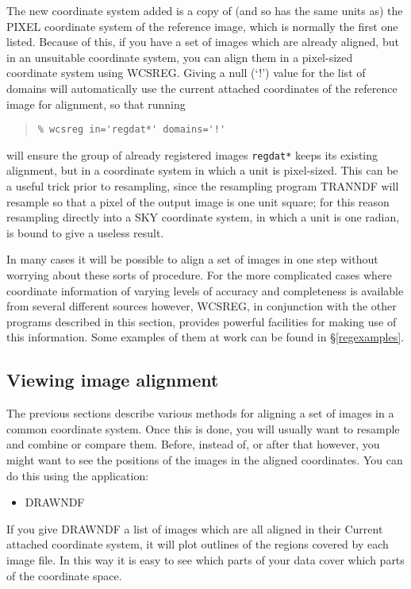 \documentclass[twoside,11pt]{article}
\newcommand{\hyperref}[4]{#2\ref{#4}#3}
\newcommand{\htmlref}[2]{#1}
\newcommand{\xlabel}[1]{}
\renewcommand{\_}{\texttt{\symbol{95}}}
\newenvironment{myquote}{\begin{quote}\begin{small}}{\end{small}\end{quote}}
\newcommand{\routine}[1]{{\sc #1}}
\newcommand{\xroutine}[1]{\htmlref{{\sc #1}}{#1}}
\begin{document}
The new coordinate system added is a copy of (and so has the same
units as) the PIXEL coordinate system of the reference image,
which is normally the first one listed.
Because of this, if you have
a set of images which are already aligned, but in an 
unsuitable coordinate system, 
you can align them in a pixel-sized coordinate system using
\routine{WCSREG}. 
Giving a null (`!') value for the list of domains will automatically
use the current attached coordinates of the reference image for 
alignment, so that running
\begin{myquote}
\begin{verbatim}
% wcsreg in='regdat*' domains='!'
\end{verbatim}
\end{myquote}
will ensure the group of already registered images {\tt regdat*} 
keeps its existing alignment, but in a coordinate system in 
which a unit is pixel-sized.
This can be a useful trick prior to resampling, 
since the resampling program \xroutine{TRANNDF} will
resample so that a pixel of the output image is one unit square;
for this reason resampling directly into a SKY coordinate system,
in which a unit is one radian, is bound to give a useless result.

In many cases it will be possible to align a set of images in
one step without worrying about these sorts of procedure.
For the more complicated cases where 
coordinate information of varying levels of 
accuracy and completeness is available from several
different sources however,
\routine{WCSREG}, in conjunction with the other programs described
in this section, provides powerful facilities for making use of
this information.  Some examples of them at work can be found
in \hyperref{the examples section}{\S }{}{regexamples}.


\subsection{\xlabel{view-align}\label{view-align}Viewing image alignment}

The previous sections describe various methods for aligning 
a set of images in a common coordinate system.  
Once this is done, you will usually want to resample and combine
or compare them.
Before, instead of, or after that however, you might want to see
the positions of the images in the aligned coordinates. 
You can do this using the application:
\begin{itemize}
\item \xroutine{DRAWNDF}
\end{itemize}
If you give \routine{DRAWNDF} 
a list of images which are all aligned in their 
Current attached coordinate system, it will plot
outlines of the regions covered by each image file.  
In this way it is easy to see 
which parts of your data cover which parts of the coordinate space.
\end{document}
